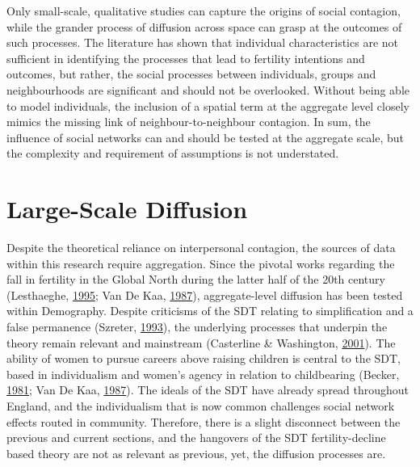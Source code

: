 \documentclass[12pt,twoside]{reedthesis}
\begin{document}
Only small-scale, qualitative studies can capture the origins of social contagion, while the grander process of diffusion across space can grasp at the outcomes of such processes. The literature has shown that individual characteristics are not sufficient in identifying the processes that lead to fertility intentions and outcomes, but rather, the social processes between individuals, groups and neighbourhoods are significant and should not be overlooked. Without being able to model individuals, the inclusion of a spatial term at the aggregate level closely mimics the missing link of neighbour-to-neighbour contagion. In sum, the influence of social networks can and should be tested at the aggregate scale, but the complexity and requirement of assumptions is not understated.

\hypertarget{large-scale-diffusion}{%
\section{Large-Scale Diffusion}\label{large-scale-diffusion}}

Despite the theoretical reliance on interpersonal contagion, the sources of data within this research require aggregation. Since the pivotal works regarding the fall in fertility in the Global North during the latter half of the 20th century (Lesthaeghe, \protect\hyperlink{ref-lesthaeghe1995}{1995}; Van De Kaa, \protect\hyperlink{ref-vandekaa1987}{1987}), aggregate-level diffusion has been tested within Demography. Despite criticisms of the SDT relating to simplification and a false permanence (Szreter, \protect\hyperlink{ref-szreter1993}{1993}), the underlying processes that underpin the theory remain relevant and mainstream (Casterline \& Washington, \protect\hyperlink{ref-casterline2001}{2001}). The ability of women to pursue careers above raising children is central to the SDT, based in individualism and women's agency in relation to childbearing (Becker, \protect\hyperlink{ref-becker1981}{1981}; Van De Kaa, \protect\hyperlink{ref-vandekaa1987}{1987}). The ideals of the SDT have already spread throughout England, and the individualism that is now common challenges social network effects routed in community. Therefore, there is a slight disconnect between the previous and current sections, and the hangovers of the SDT fertility-decline based theory are not as relevant as previous, yet, the diffusion processes are.
\end{document}
